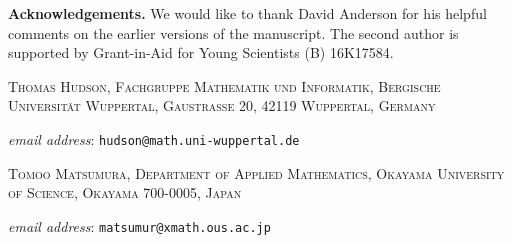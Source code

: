 \documentclass[12pt, reqno,sumlimits]{amsart}
\theoremstyle{definition}
\numberwithin{equation}{section}
\begin{document}
\vspace{3mm}

\noindent\textbf{Acknowledgements.} 
We would like to thank David Anderson for his helpful comments on the earlier versions of the manuscript. The second author is supported by Grant-in-Aid for Young Scientists (B) 16K17584.

{}

\begin{small}
{\scshape
\noindent Thomas Hudson, Fachgruppe Mathematik
und Informatik, Bergische Universit\"{a}t Wuppertal, Gaustrasse 20, 42119 Wuppertal, Germany
}
\end{small}

{\textit{email address}: \tt{hudson@math.uni-wuppertal.de}}
 
\begin{small}
{\scshape
\noindent Tomoo Matsumura, Department of Applied Mathematics, Okayama University of Science, Okayama 700-0005, Japan
}
\end{small}

{\textit{email address}: \tt{matsumur@xmath.ous.ac.jp}}

\end{document}
